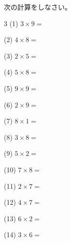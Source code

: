 \documentclass[a4paper, 11pt]{ltjsarticle}
\begin{document}
\hfill

\vspace*{2ex}
次の計算をしなさい。
\vspace*{5ex}

\begin{multicols*}{3}
\noindent (1) \quad $3 \times 9 =$
\vspace*{\fill}

\noindent (2) \quad $4 \times 8 =$
\vspace*{\fill}

\noindent (3) \quad $2 \times 5 =$
\vspace*{\fill}

\noindent (4) \quad $5 \times 8 =$
\vspace*{\fill}

\noindent (5) \quad $9 \times 9 =$
\vspace*{\fill}

\noindent (6) \quad $2 \times 9 =$
\vspace*{\fill}

\noindent (7) \quad $8 \times 1 =$
\vspace*{\fill}

\noindent (8) \quad $3 \times 8 =$
\vspace*{\fill}

\noindent (9) \quad $5 \times 2 =$
\vspace*{\fill}

\noindent (10) \quad $7 \times 8 =$
\vspace*{\fill}

\noindent (11) \quad $2 \times 7 =$
\vspace*{\fill}

\noindent (12) \quad $4 \times 7 =$
\vspace*{\fill}
\columnbreak

\noindent (13) \quad $6 \times 2 =$
\vspace*{\fill}

\noindent (14) \quad $3 \times 6 =$
\vspace*{\fill}


\end{multicols*}
\end{document}
